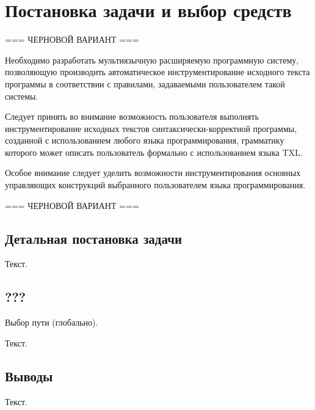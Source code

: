 \chapter{Постановка задачи и выбор средств}

=== ЧЕРНОВОЙ ВАРИАНТ ===

Необходимо разработать мультиязычную расширяемую программную систему, позволяющую производить автоматическое инструментирование исходного текста программы в соответствии с правилами, задаваемыми пользователем такой системы.

Следует принять во внимание возможность пользователя выполнять инструментирование исходных текстов синтаксически-корректной программы, созданной с использованием любого языка программирования, грамматику которого может описать пользователь формально с использованием языка TXL.

Особое внимание следует уделить возможности инструментирования основных управляющих конструкций выбранного пользователем языка программирования.

=== ЧЕРНОВОЙ ВАРИАНТ ===

\section{Детальная постановка задачи}

Текст.

\section{???}

Выбор пути (глобально).

Текст.

\section{Выводы}

Текст.
